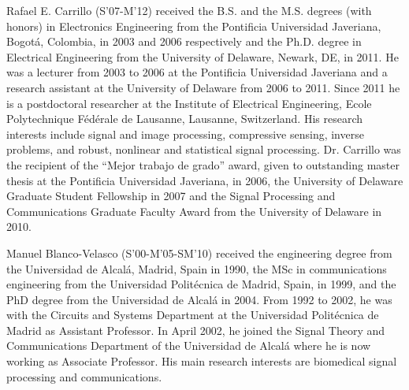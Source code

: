 \documentclass[journal]{IEEEtran}
\begin{document}
\begin{IEEEbiography}{Rafael E. Carrillo}
(S'07-M'12) received the B.S. and the M.S. degrees (with honors) in Electronics Engineering from the Pontificia Universidad Javeriana, Bogot\'{a}, Colombia, in 2003 and 2006 respectively and the Ph.D. degree in Electrical Engineering from the University of Delaware, Newark, DE, in 2011. He was a lecturer from 2003 to 2006 at the Pontificia Universidad Javeriana and a research assistant at the University of Delaware from 2006 to 2011. Since 2011 he is a postdoctoral researcher at the Institute of Electrical Engineering, Ecole Polytechnique F{\'e}d{\'e}rale de Lausanne, Lausanne, Switzerland.
His research interests include signal and image processing, compressive sensing, inverse problems, and robust, nonlinear and statistical signal processing. Dr. Carrillo was the recipient of the ``Mejor trabajo de grado'' award, given to outstanding master thesis at the Pontificia Universidad Javeriana, in 2006, the University of Delaware Graduate Student Fellowship in 2007 and the Signal Processing and Communications Graduate Faculty Award from the University of Delaware in 2010.
\end{IEEEbiography}
\vspace{-0.5cm}
\begin{IEEEbiography}{Manuel Blanco-Velasco}
(S'00-M'05-SM'10) received the engineering degree from the Universidad de Alcal\'{a}, Madrid, Spain in 1990, the MSc in communications engineering from the Universidad Polit\'{e}cnica de Madrid, Spain, in 1999, and the PhD degree from the Universidad de Alcal\'{a} in 2004. From 1992 to 2002, he was with the Circuits and Systems Department at the Universidad Polit\'{e}cnica de Madrid as Assistant Professor. In April 2002, he joined the Signal Theory and Communications Department of the Universidad de Alcal\'{a} where he is now working as Associate Professor. His main research interests are biomedical signal processing and communications.
\end{IEEEbiography}
\vspace{-0.5cm}
\end{document}

